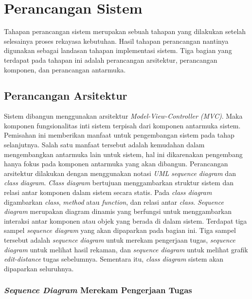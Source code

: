 

\section{Perancangan Sistem}

Tahapan perancangan sistem merupakan sebuah tahapan yang dilakukan
setelah selesainya proses rekayasa kebutuhan. Hasil tahapan
perancangan nantinya digunakan sebagai landasan tahapan implementasi
sistem. Tiga bagian yang terdapat pada tahapan ini adalah
perancangan arsitektur, perancangan komponen, dan perancangan
antarmuka.

\subsection{Perancangan Arsitektur}

Sistem dibangun menggunakan arsitektur \emph{Model-View-Controller (MVC)}.
Maka komponen fungsionalitas inti sistem terpisah dari komponen antarmuka
sistem. Pemisahan ini memberikan manfaat untuk pengembangan sistem pada tahap
selanjutnya. Salah satu manfaat tersebut adalah kemudahan dalam mengembangkan
antarmuka lain untuk sistem, hal ini dikarenakan pengembang hanya fokus pada
komponen antarmuka yang akan dibangun.
Perancangan arsitektur dilakukan dengan menggunakan notasi \emph{UML}
\emph{sequence diagram} dan \emph{class diagram}. \emph{Class diagram}
bertujuan menggambarkan struktur sistem dan relasi antar komponen dalam sistem
secara statis. Pada \emph{class diagram} digambarkan \emph{class},
\emph{method} atau
\emph{function}, dan relasi antar \emph{class}. \emph{Sequence
  diagram} merupakan diagram dinamis yang berfungsi untuk
menggambarkan interaksi antar komponen atau objek yang berada di dalam sistem.
Terdapat tiga sampel \emph{sequence diagram} yang akan dipaparkan pada
bagian ini. Tiga sampel tersebut adalah \emph{sequence diagram} untuk
merekam pengerjaan tugas, \emph{sequence diagram} untuk melihat hasil
rekaman, dan \emph{sequence diagram} untuk melihat grafik \emph{edit-distance}
tugas sebelumnya. Sementara itu, \emph{class diagram} sistem akan dipaparkan seluruhnya.

\subsubsection{\emph{Sequence Diagram} Merekam Pengerjaan Tugas}


